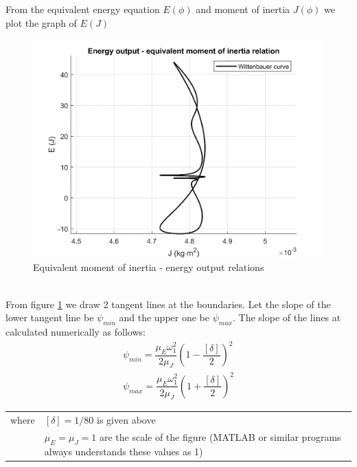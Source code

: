 From the equivalent energy equation $ E(\phi) $ and moment of inertia $ J(\phi) $ we plot the graph of $ E(J) $
\begin{figure}[h]
	\centering
	\includegraphics[width=0.6\linewidth]{21}
	\caption{Equivalent moment of inertia - energy output relations}
	\label{fig:21}
\end{figure}\\
From figure \ref{fig:21} we draw 2 tangent lines at the boundaries. Let the slope of the lower tangent line be $ \psi_{min} $ and the upper one be $ \psi_{max} $. The slope of the lines at calculated numerically as follows:
\begin{equation}
\begin{array}{c}
\psi_{min}=\dfrac{\mu_E\omega_1^2}{2\mu_J}\left(1-\dfrac{[\delta]}{2}\right)^2\\
\psi_{max}=\dfrac{\mu_E\omega_1^2}{2\mu_J}\left(1+\dfrac{[\delta]}{2}\right)^2
\end{array}
\end{equation}
\begin{tabular}{p{2cm}p{13.5cm}}
	where&$ [\delta]=1/80 $ is given above\\
	&$ \mu_E=\mu_J =1$ are the scale of the figure (MATLAB\textup{\textregistered} or similar programs always understands these values as 1)
\end{tabular}

